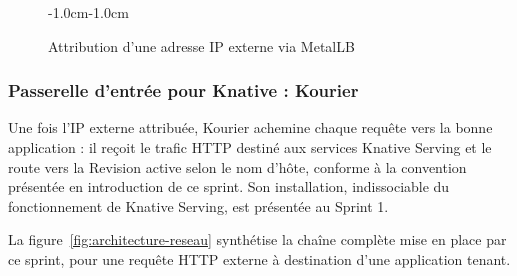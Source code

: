 \begin{figure}[H]
\begin{adjustwidth}{-1.0cm}{-1.0cm}
\caption{Attribution d'une adresse IP externe via MetalLB}
\label{fig:metallb-flux}
\end{adjustwidth}
\end{figure}

\subsubsection{Passerelle d'entrée pour Knative : Kourier}

Une fois l'IP externe attribuée, Kourier \cite{KourierDoc} achemine chaque requête vers la bonne application : il reçoit le trafic HTTP destiné aux services Knative Serving et le route vers la Revision active selon le nom d'hôte, conforme à la convention présentée en introduction de ce sprint. Son installation, indissociable du fonctionnement de Knative Serving, est présentée au Sprint 1.

La figure~\ref{fig:architecture-reseau} synthétise la chaîne complète mise en place par ce sprint, pour une requête HTTP externe à destination d'une application tenant.

